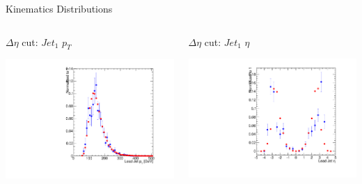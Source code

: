 \documentclass[8pt]{beamer}
\begin{document}
\begin{frame}{Kinematics Distributions}

\begin{columns}
\begin{block}{$\Delta\eta$ cut: $Jet_1$ $p_T$}
 
\centering
\includegraphics[width=\linewidth]{img/DEta_jpt_1.pdf} 
 
\end{block}

\begin{block}{$\Delta\eta$ cut: $Jet_1$ $\eta$}

\centering
\includegraphics[width=\linewidth]{img/DEta_jeta_1.pdf} 
 
\end{block}


\end{columns}
\end{frame}
\end{document}
